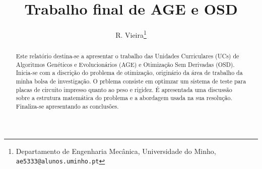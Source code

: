 \documentclass[a4paper,12pt]{article}
\begin{document}
%
\title{Trabalho final de AGE e OSD}


\author{R. Vieira\thanks{Departamento de Engenharia Mecânica, Universidade do Minho, {\tt ae5333@alunos.uminho.pt}}}

\maketitle              %

\begin{abstract}
Este relatório destina-se a apresentar o trabalho das Unidades Curriculares (UCs) de Algoritmos Genéticos e Evolucionários (AGE) e Otimização Sem Derivadas (OSD). Inicia-se com a discrição do problema de otimização, originário da área de trabalho da minha bolsa de investigação. O prblema consiste em optimzar um sistema de teste para placas de circuito impresso quanto ao peso e rigidez. É apresentada uma discussão sobre a estrutura matemática do problema e a abordagem usada na sua resolução. Finaliza-se apresentando as conclusões.
\end{abstract}
\end{document}
